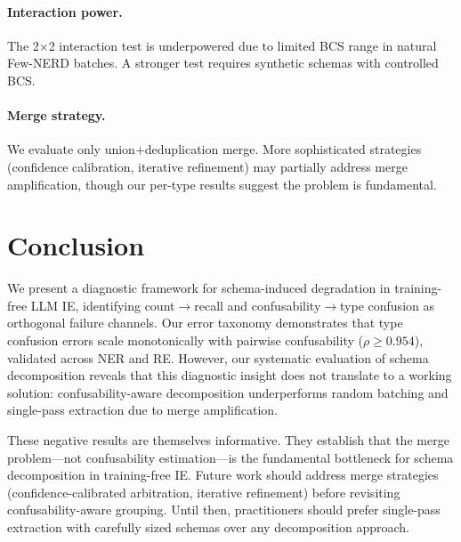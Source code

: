 \documentclass[11pt,a4paper]{article}
\begin{document}
\paragraph{Interaction power.} The 2$\times$2 interaction test is underpowered due to limited BCS range in natural Few-NERD batches. A stronger test requires synthetic schemas with controlled BCS.

\paragraph{Merge strategy.} We evaluate only union+deduplication merge. More sophisticated strategies (confidence calibration, iterative refinement) may partially address merge amplification, though our per-type results suggest the problem is fundamental.

\section{Conclusion}

We present a diagnostic framework for schema-induced degradation in training-free LLM IE, identifying count$\rightarrow$recall and confusability$\rightarrow$type confusion as orthogonal failure channels. Our error taxonomy demonstrates that type confusion errors scale monotonically with pairwise confusability ($\rho \geq 0.954$), validated across NER and RE. However, our systematic evaluation of schema decomposition reveals that this diagnostic insight does not translate to a working solution: confusability-aware decomposition underperforms random batching and single-pass extraction due to merge amplification.

These negative results are themselves informative. They establish that the merge problem---not confusability estimation---is the fundamental bottleneck for schema decomposition in training-free IE. Future work should address merge strategies (confidence-calibrated arbitration, iterative refinement) before revisiting confusability-aware grouping. Until then, practitioners should prefer single-pass extraction with carefully sized schemas over any decomposition approach.
\end{document}
